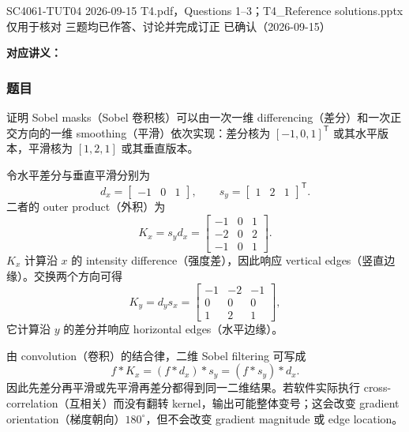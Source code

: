
\label{tutorial:SC4061-TUT04}

\tutorialmeta
  {SC4061-TUT04}
  {2026-09-15}
  {T4.pdf，Questions 1--3；T4\_Reference solutions.pptx 仅用于核对}
  {三题均已作答、讨论并完成订正}
  {已确认（2026-09-15）}


\textbf{对应讲义：}

\subsubsection*{题目}

证明 Sobel masks（Sobel 卷积核）可以由一次一维 differencing（差分）和一次正交方向的一维 smoothing（平滑）依次实现：差分核为 $[-1,0,1]^{\mathsf T}$ 或其水平版本，平滑核为 $[1,2,1]$ 或其垂直版本。

\begin{checkedsolution}
令水平差分与垂直平滑分别为
\[
  d_x=\begin{bmatrix}-1&0&1\end{bmatrix},\qquad
  s_y=\begin{bmatrix}1&2&1\end{bmatrix}^{\mathsf T}.
\]
二者的 outer product（外积）为
\[
  K_x=s_y d_x
  =\begin{bmatrix}
    -1&0&1\\
    -2&0&2\\
    -1&0&1
  \end{bmatrix}.
\]
$K_x$ 计算沿 $x$ 的 intensity difference（强度差），因此响应 vertical edges（竖直边缘）。交换两个方向可得
\[
  K_y=d_y s_x
  =\begin{bmatrix}
    -1&-2&-1\\
    0&0&0\\
    1&2&1
  \end{bmatrix},
\]
它计算沿 $y$ 的差分并响应 horizontal edges（水平边缘）。

由 convolution（卷积）的结合律，二维 Sobel filtering 可写成
\[
  f*K_x=(f*d_x)*s_y=(f*s_y)*d_x.
\]
因此先差分再平滑或先平滑再差分都得到同一二维结果。若软件实际执行 cross-correlation（互相关）而没有翻转 kernel，输出可能整体变号；这会改变 gradient orientation（梯度朝向）$180^\circ$，但不会改变 gradient magnitude 或 edge location。
\end{checkedsolution}

